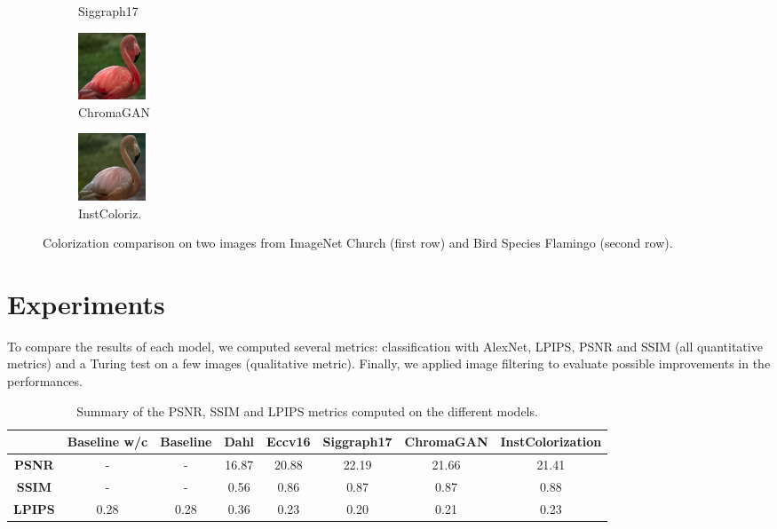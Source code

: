 \documentclass[10pt,twocolumn,letterpaper]{article}
\begin{document}
\begin{figure}[ht]
\begin{subfigure}[b]{0.1\textwidth}
		\caption{Siggraph17}
	\end{subfigure}
	\hfill
	\begin{subfigure}[b]{0.1\textwidth}
		\includegraphics[width=2cm]{chr - flamingo.jpg}
		\caption{ChromaGAN}
	\end{subfigure}
	\hfill
	\begin{subfigure}[b]{0.1\textwidth}
		\includegraphics[width=2cm]{su - flamingo.png}
		\caption{InstColoriz.}
	\end{subfigure}
	\caption{{\small Colorization comparison on two images from ImageNet Church (first row) and Bird Species Flamingo (second row).}}
	\label{fig:imagenet}
\end{figure}



\section{Experiments}
To compare the results of each model, we computed several metrics: classification with AlexNet, LPIPS, PSNR and SSIM
(all quantitative metrics) and a Turing test on a few images (qualitative metric). Finally, we applied image filtering to evaluate possible improvements in the performances.

\begin{table}[ht]
	\begin{center}
		\begin{tabular}{c|ccccccc}
			& \textbf{Baseline w/c}&\textbf{Baseline} & \textbf{Dahl} & \textbf{Eccv16} & \textbf{Siggraph17} & \textbf{ChromaGAN} & \textbf{InstColorization}  \\
			\midrule
			\textbf{PSNR} & - & - & 16.87 & 20.88 & 22.19 & 21.66 & 21.41 \\
			\midrule
			\textbf{SSIM} & - & - & 0.56 & 0.86 & 0.87 & 0.87 & 0.88 \\
			\midrule
			\textbf{LPIPS} & 0.28 & 0.28 & 0.36 & 0.23 & 0.20 & 0.21 & 0.23 \\
		\end{tabular}
	\end{center}
	\caption{{\small  Summary of the PSNR, SSIM and LPIPS metrics computed on the different models.}}
	\label{tab:metrics}
\end{table}
\end{document}
